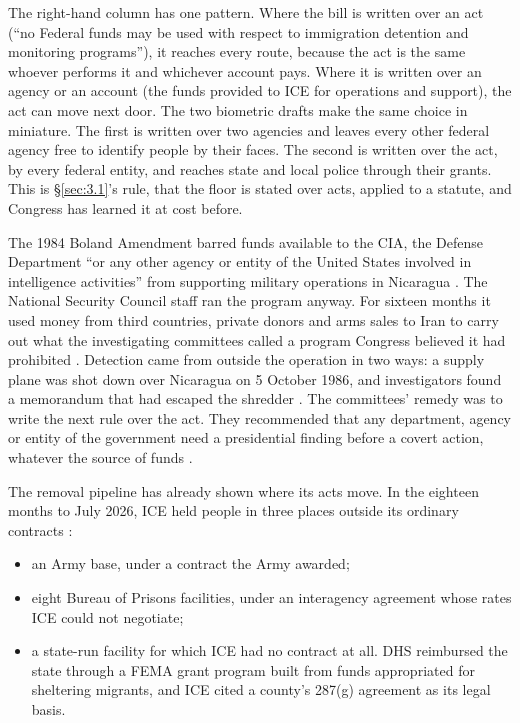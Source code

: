 The right-hand column has one pattern. Where the bill is written over an act (“no Federal funds may be used with respect to immigration detention and monitoring programs”), it reaches every route, because the act is the same whoever performs it and whichever account pays. Where it is written over an agency or an account (the funds provided to ICE for operations and support), the act can move next door. The two biometric drafts make the same choice in miniature. The first is written over two agencies and leaves every other federal agency free to identify people by their faces. The second is written over the act, by every federal entity, and reaches state and local police through their grants. This is \S\ref{sec:3.1}'s rule, that the floor is stated over acts, applied to a statute, and Congress has learned it at cost before.

The 1984 Boland Amendment barred funds available to the CIA, the Defense Department “or any other agency or entity of the United States involved in intelligence activities” from supporting military operations in Nicaragua \autocite[§8066(a)]{boland1984}. The National Security Council staff ran the program anyway. For sixteen months it used money from third countries, private donors and arms sales to Iran to carry out what the investigating committees called a program Congress believed it had prohibited \autocite{irancontra1987}. Detection came from outside the operation in two ways: a supply plane was shot down over Nicaragua on 5 October 1986, and investigators found a memorandum that had escaped the shredder \autocite{irancontra1987}. The committees' remedy was to write the next rule over the act. They recommended that any department, agency or entity of the government need a presidential finding before a covert action, whatever the source of funds \autocite{irancontra1987}.

The removal pipeline has already shown where its acts move. In the eighteen months to July 2026, ICE held people in three places outside its ordinary contracts \autocite{gao2026detention}:

\begin{itemize}
\item an Army base, under a contract the Army awarded;
\item eight Bureau of Prisons facilities, under an interagency agreement whose rates ICE could not negotiate;
\item a state-run facility for which ICE had no contract at all. DHS reimbursed the state through a FEMA grant program built from funds appropriated for sheltering migrants, and ICE cited a county's 287(g) agreement as its legal basis.
\end{itemize}

